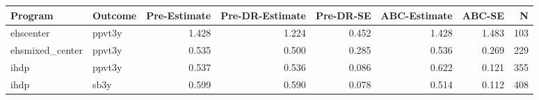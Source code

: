 \begin{table}[ht]
\centering
\begin{tabular}{llrrrrrr}
  \hline
Program & Outcome & Pre-Estimate & Pre-DR-Estimate & Pre-DR-SE & ABC-Estimate & ABC-SE & N \\ 
  \hline
ehscenter & ppvt3y & 1.428 & 1.224 & 0.452 & 1.428 & 1.483 & 103 \\ 
  ehsmixed\_center & ppvt3y & 0.535 & 0.500 & 0.285 & 0.536 & 0.269 & 229 \\ 
  ihdp & ppvt3y & 0.537 & 0.536 & 0.086 & 0.622 & 0.121 & 355 \\ 
  ihdp & sb3y & 0.599 & 0.590 & 0.078 & 0.514 & 0.112 & 408 \\ 
   \hline
\end{tabular}
\end{table}
